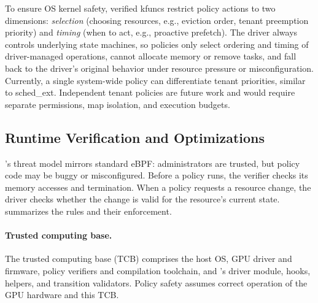 

To ensure OS kernel safety, verified kfuncs restrict policy actions to two dimensions: \emph{selection} (choosing resources, e.g., eviction order, tenant preemption priority) and \emph{timing} (when to act, e.g., proactive prefetch).
The driver always controls underlying state machines, so policies only select ordering and timing of driver-managed operations, cannot allocate memory or remove tasks, and fall back to the driver's original behavior under resource pressure or misconfiguration.
Currently, a single system-wide policy can differentiate tenant priorities, similar to sched\_ext.
Independent tenant policies are future work and would require separate permissions, map isolation, and execution budgets.

\subsection{Runtime Verification and Optimizations}
\label{sec:verification}

\sys{}'s threat model mirrors standard eBPF: administrators are trusted, but policy code may be buggy or misconfigured.
Before a policy runs, the verifier checks its memory accesses and termination.
When a policy requests a resource change, the driver checks whether the change is valid for the resource's current state.
 summarizes the rules and their enforcement.

\paragraph{Trusted computing base.}
The trusted computing base (TCB) comprises the host OS, GPU driver and firmware, policy verifiers and compilation toolchain, and \sys{}'s driver module, hooks, helpers, and transition validators.
Policy safety assumes correct operation of the GPU hardware and this TCB.

